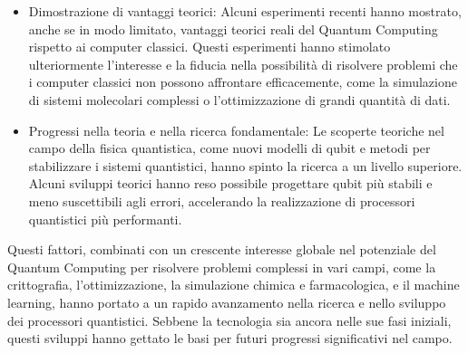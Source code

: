 \documentclass[a4paper,12pt]{report}
\theoremstyle{plain}
\begin{document}
\begin{itemize}
  \item Dimostrazione di vantaggi teorici: Alcuni esperimenti recenti hanno mostrato, anche se in modo limitato, vantaggi teorici reali del Quantum Computing rispetto ai computer classici. Questi esperimenti hanno stimolato ulteriormente l'interesse e la fiducia nella possibilità di risolvere problemi che i computer classici non possono affrontare efficacemente, come la simulazione di sistemi molecolari complessi o l'ottimizzazione di grandi quantità di dati.
  \item Progressi nella teoria e nella ricerca fondamentale: Le scoperte teoriche nel campo della fisica quantistica, come nuovi modelli di qubit e metodi per stabilizzare i sistemi quantistici, hanno spinto la ricerca a un livello superiore. Alcuni sviluppi teorici hanno reso possibile progettare qubit più stabili e meno suscettibili agli errori, accelerando la realizzazione di processori quantistici più performanti.
\end{itemize}
Questi fattori, combinati con un crescente interesse globale nel potenziale del Quantum Computing per risolvere problemi complessi in vari campi, come la crittografia, l'ottimizzazione, la simulazione chimica e farmacologica, e il machine learning, hanno portato a un rapido avanzamento nella ricerca e nello sviluppo dei processori quantistici. Sebbene la tecnologia sia ancora nelle sue fasi iniziali, questi sviluppi hanno gettato le basi per futuri progressi significativi nel campo.
\end{document}
